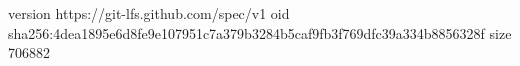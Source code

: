version https://git-lfs.github.com/spec/v1
oid sha256:4dea1895e6d8fe9e107951c7a379b3284b5caf9fb3f769dfc39a334b8856328f
size 706882
